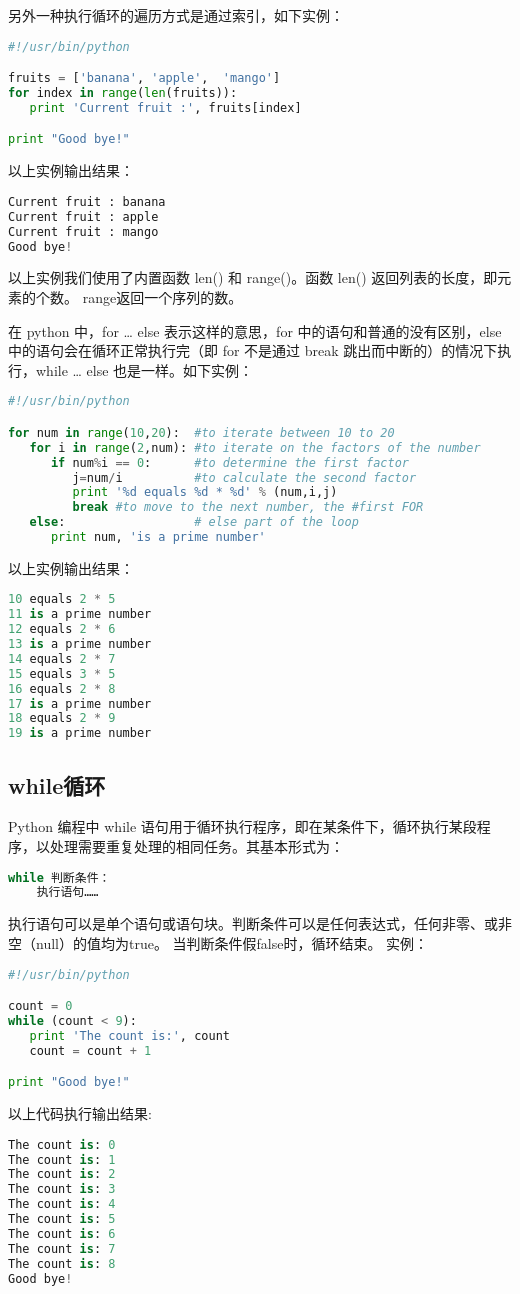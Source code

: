 另外一种执行循环的遍历方式是通过索引，如下实例：
\begin{lstlisting}[language=Python]
#!/usr/bin/python

fruits = ['banana', 'apple',  'mango']
for index in range(len(fruits)):
   print 'Current fruit :', fruits[index]

print "Good bye!"
\end{lstlisting}
以上实例输出结果：
\begin{lstlisting}[language=Python]
Current fruit : banana
Current fruit : apple
Current fruit : mango
Good bye!
\end{lstlisting}
以上实例我们使用了内置函数 len() 和 range()。函数 len() 返回列表的长度，即元素的个数。 range返回一个序列的数。

在 python 中，for … else 表示这样的意思，for 中的语句和普通的没有区别，else 中的语句会在循环正常执行完（即 for 不是通过 break 跳出而中断的）的情况下执行，while … else 也是一样。如下实例：
\begin{lstlisting}[language=Python]
#!/usr/bin/python

for num in range(10,20):  #to iterate between 10 to 20
   for i in range(2,num): #to iterate on the factors of the number
      if num%i == 0:      #to determine the first factor
         j=num/i          #to calculate the second factor
         print '%d equals %d * %d' % (num,i,j)
         break #to move to the next number, the #first FOR
   else:                  # else part of the loop
      print num, 'is a prime number'
\end{lstlisting}
以上实例输出结果：
\begin{lstlisting}[language=Python]
10 equals 2 * 5
11 is a prime number
12 equals 2 * 6
13 is a prime number
14 equals 2 * 7
15 equals 3 * 5
16 equals 2 * 8
17 is a prime number
18 equals 2 * 9
19 is a prime number
\end{lstlisting}


\subsection{while循环}
Python 编程中 while 语句用于循环执行程序，即在某条件下，循环执行某段程序，以处理需要重复处理的相同任务。其基本形式为：
\begin{lstlisting}[language=Python]
while 判断条件：
    执行语句……
\end{lstlisting}
执行语句可以是单个语句或语句块。判断条件可以是任何表达式，任何非零、或非空（null）的值均为true。
当判断条件假false时，循环结束。
实例：
\begin{lstlisting}[language=Python]
#!/usr/bin/python

count = 0
while (count < 9):
   print 'The count is:', count
   count = count + 1

print "Good bye!"
\end{lstlisting}
以上代码执行输出结果:
\begin{lstlisting}[language=Python]
The count is: 0
The count is: 1
The count is: 2
The count is: 3
The count is: 4
The count is: 5
The count is: 6
The count is: 7
The count is: 8
Good bye!
\end{lstlisting}

